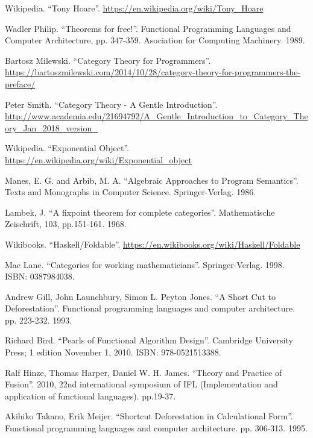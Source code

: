 \documentclass{article}
\begin{document}
\begin{thebibliography}{99}
Wikipedia. ``Tony Hoare''. \url{https://en.wikipedia.org/wiki/Tony_Hoare}

Wadler Philip. ``Theorems for free!''. Functional Programming Languages and Computer Architecture, pp. 347-359. Asociation for Computing Machinery. 1989.

Bartosz Milewski. ``Category Theory for Programmers''. \url{https://bartoszmilewski.com/2014/10/28/category-theory-for-programmers-the-preface/}

Peter Smith. ``Category Theory - A Gentle Introduction''. \url{http://www.academia.edu/21694792/A_Gentle_Introduction_to_Category_Theory_Jan_2018_version_}

Wikipedia. ``Exponential Object''. \url{https://en.wikipedia.org/wiki/Exponential_object}

Manes, E. G. and Arbib, M. A. ``Algebraic Approaches to Program Semantics''. Texts and Monographs in Computer Science. Springer-Verlag. 1986.

Lambek, J. ``A fixpoint theorem for complete categories''. Mathematische Zeischrift, 103, pp.151-161. 1968.

Wikibooks. ``Haskell/Foldable''. \url{https://en.wikibooks.org/wiki/Haskell/Foldable}

Mac Lane. ``Categories for working mathematicians''. Springer-Verlag. 1998. ISBN: 0387984038.


Andrew Gill, John Launchbury, Simon L. Peyton Jones. ``A Short Cut to Deforestation''. Functional programming languages and computer architecture. pp. 223-232. 1993.

Richard Bird. ``Pearls of Functional Algorithm Design''. Cambridge University Press; 1 edition November 1, 2010. ISBN: 978-0521513388.

Ralf Hinze, Thomas Harper, Daniel W. H. James. ``Theory and Practice of Fusion''. 2010, 22nd international symposium of IFL (Implementation and application of functional languages). pp.19-37.

Akihiko Takano, Erik Meijer. ``Shortcut Deforestation in Calculational Form''. Functional programming languages and computer architecture. pp. 306-313. 1995.


\end{thebibliography}
\end{document}
